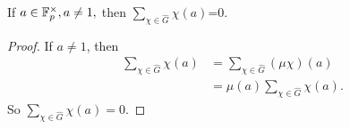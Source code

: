 \begin{corollary}
If $a\in\mathbb{F}_p^{\times}, a\ne1,$ then $\sum_{\chi\in\hat{G}}\chi(a)$=0.
\end{corollary}
\begin{proof}
If $a\ne1$, then \begin{align*}
\sum_{\chi\in\hat{G}}\chi(a) &=\sum_{\chi\in\hat{G}}(\mu\chi)(a)\\ 
&=\mu(a)\sum_{\chi\in\hat{G}}\chi(a).
\end{align*}
So $\sum_{\chi\in\hat{G}}\chi(a)=0$.
\end{proof}
